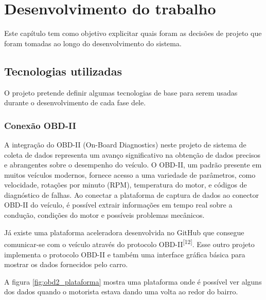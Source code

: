 \chapter{Desenvolvimento do trabalho}


Este capítulo tem como objetivo explicitar quais foram as decisões de projeto que foram tomadas ao longo do desenvolvimento do sistema.

\section{Tecnologias utilizadas}
O projeto pretende definir algumas tecnologias de base para serem usadas durante o desenvolvimento de cada fase dele.

    \subsection{Conexão OBD-II}
A integração do OBD-II (On-Board Diagnostics) neste projeto de sistema de coleta de dados representa um avanço significativo na obtenção de dados precisos e abrangentes sobre o desempenho do veículo. O OBD-II, um padrão presente em muitos veículos modernos, fornece acesso a uma variedade de parâmetros, como velocidade, rotações por minuto (RPM), temperatura do motor, e códigos de diagnóstico de falhas. Ao conectar a plataforma de captura de dados ao conector OBD-II do veículo, é possível extrair informações em tempo real sobre a condução, condições do motor e possíveis problemas mecânicos.

Já existe uma plataforma aceleradora desenvolvida no GitHub que consegue
comunicar-se com o veículo através do protocolo OBD-II\textsuperscript{[12]}. Esse outro projeto
implementa o protocolo OBD-II e também uma interface gráfica básica para mostrar
os dados fornecidos pelo carro.

A figura \ref{fig:obd2_plataforma} mostra uma plataforma onde é possível ver alguns dos dados quando o motorista estava dando uma volta ao redor do bairro.

